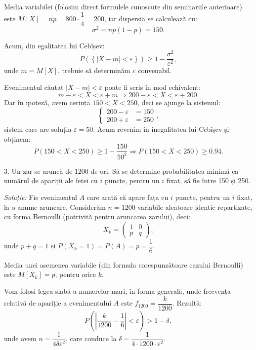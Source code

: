 Media variabilei (folosim direct formulele cunoscute din seminariile anterioare)
este $ M[X] = np = 800 \cdot \dfrac{1}{4} = 200 $, iar dispersia se calculează cu:
\[
  \sigma^2 = np(1-p) = 150.
\]

Acum, din egalitatea lui Cebîșev:
\[
  P \left( \left\{ | X - m | < \varepsilon \right\} \right) \geq 1 - \dfrac{\sigma^2}{\varepsilon^2},
\]
unde $ m = M[X] $, trebuie să determinăm $ \varepsilon $ convenabil.

Evenimentul căutat $ |X - m| < \varepsilon $ poate fi scris în mod echivalent:
\[
  m-\varepsilon < X < \varepsilon + m \Rightarrow 200 - \varepsilon < X < \varepsilon + 200.
\]
Dar în ipoteză, avem cerința $ 150 < X < 250 $, deci se ajunge la sistemul:
\[
  \begin{cases}
    200 - \varepsilon &= 150 \\
    200 + \varepsilon &= 250
  \end{cases},
\]
sistem care are soluția $ \varepsilon = 50 $. Acum revenim în inegalitatea
lui Cebîșev și obținem:
\[
  P(150 < X < 250) \geq 1 - \dfrac{150}{50^2} \Rightarrow %
  P(150 < X < 250) \geq 0.94.
\]

\vspace{0.3cm}

3. Un zar se aruncă de 1200 de ori. Să se determine probabilitatea minimă ca
numărul de apariții ale feței cu $ i $ puncte, pentru un $ i $ fixat, să fie
între 150 și 250.

\emph{Soluție:} Fie evenimentul $ A $ care arată că apare fața cu $ i $ puncte,
pentru un $ i $ fixat, la o anume aruncare. Considerăm $ n = 1200 $ variabile
aleatoare identic repartizate, cu forma Bernoulli (potrivită pentru aruncarea
zarului), deci:
\[
  X_k = \begin{pmatrix}
    1 & 0 \\
    p & q
  \end{pmatrix},
\]
unde $ p + q = 1 $ și $ P(X_k = 1) = P(A) = p = \dfrac{1}{6} $.

Media unei asemenea variabile (din formula corespunzătoare cazului Bernoulli)
este $ M[X_k] = p $, pentru orice $ k $.

Vom folosi legea slabă a numerelor mari, în forma generală, unde frecvența
relativă de apariție a evenimentului $ A $ este $ f_{1200} = \dfrac{k}{1200} $.
Rezultă:
\[
  P \left( \left| \dfrac{k}{1200} - \dfrac{1}{6} \right| < \varepsilon \right) > 1 - \delta,
\]
unde avem $ n = \dfrac{1}{4\delta \varepsilon^2} $, care conduce la
$ \delta = \dfrac{1}{4 \cdot 1200 \cdot \varepsilon^2} $.

